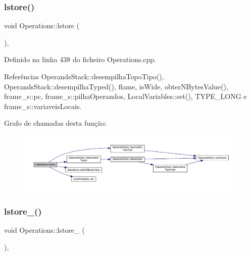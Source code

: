 \subsubsection{\texorpdfstring{lstore()}{lstore()}}
{\footnotesize\ttfamily void Operations\+::lstore (\begin{DoxyParamCaption}{ }\end{DoxyParamCaption})\hspace{0.3cm}{\ttfamily [static]}, {\ttfamily [private]}}



Definido na linha 438 do ficheiro Operations.\+cpp.



Referências Operands\+Stack\+::desempilha\+Topo\+Tipo(), Operands\+Stack\+::desempilha\+Typed(), flame, is\+Wide, obter\+N\+Bytes\+Value(), frame\+\_\+s\+::pc, frame\+\_\+s\+::pilha\+Operandos, Local\+Variables\+::set(), T\+Y\+P\+E\+\_\+\+L\+O\+NG e frame\+\_\+s\+::variaveis\+Locais.

Grafo de chamadas desta função\+:
\nopagebreak
\begin{figure}[H]
\begin{center}
\leavevmode
\includegraphics[width=350pt]{classOperations_a233917ec136fa6ce064f04b410e15f87_cgraph}
\end{center}
\end{figure}
\mbox{\label{classOperations_ae3c949d56a3ee685668134493595334b}} 
\subsubsection{\texorpdfstring{lstore\+\_()}{lstore\_0()}}
{\footnotesize\ttfamily void Operations\+::lstore\+\_ (\begin{DoxyParamCaption}{ }\end{DoxyParamCaption})\hspace{0.3cm}{\ttfamily [static]}, {\ttfamily [private]}}



